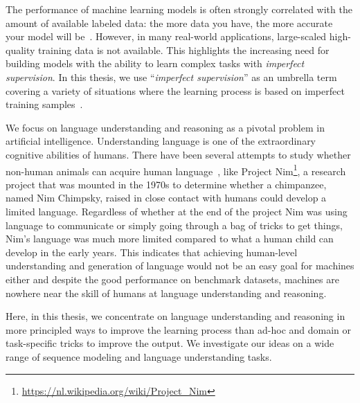 
The performance of machine learning models is often strongly correlated with the amount of available labeled data:
the more data you have, the more accurate your model will be~\citep{halevy2009unreasonable,sun2017revisiting}.  
However, in many real-world applications, large-scaled high-quality training data is not available.
This highlights the increasing need for building models with the ability to learn complex tasks with \emph{imperfect supervision}. 
In this thesis, we use ``\emph{imperfect supervision}'' as an umbrella term covering a variety of situations where the learning process is based on imperfect training samples~\citep{zhou2018brief}.


We focus on language understanding and reasoning as a pivotal problem in artificial intelligence.  Understanding language is one of the extraordinary cognitive abilities of humans. 
There have been several attempts to study whether non-human animals can acquire human language~\citep{pepperberg2017animal}, like Project Nim\footnote{\url{https://nl.wikipedia.org/wiki/Project_Nim}}, a research project that was mounted in the 1970s to determine whether a chimpanzee, named Nim Chimpsky, raised in close contact with humans could develop a limited language. 
Regardless of whether at the end of the project Nim was using language to communicate or simply going through a bag of tricks to get things, Nim's language was much more limited compared to what a human child can develop in the early years. 
%
This indicates that achieving human-level understanding and generation of language would not be an easy goal for machines either and despite the good performance on benchmark datasets, machines are nowhere near the skill of humans at language understanding and reasoning.

Here, in this thesis, we concentrate on language understanding and reasoning in more principled ways to improve the learning process than ad-hoc and domain or task-specific tricks to improve the output. We investigate our ideas on a wide range of sequence modeling and language understanding tasks.

